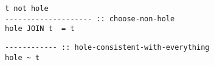 \begin{verbatim}
t not hole
-------------------- :: choose-non-hole
hole JOIN t  = t
\end{verbatim}
\begin{verbatim}
------------ :: hole-consistent-with-everything
hole ~ t
\end{verbatim}


